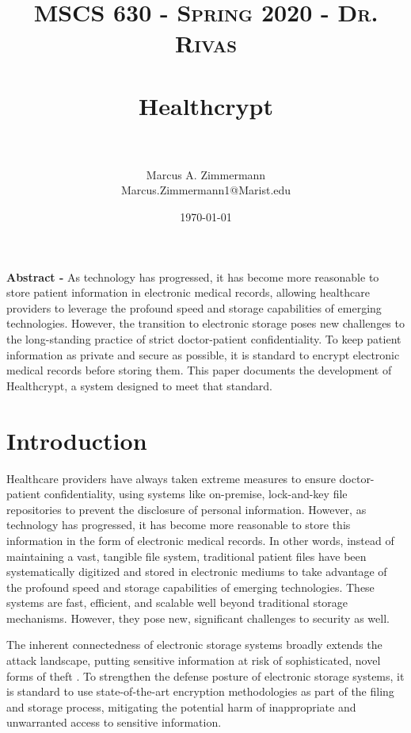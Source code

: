 \documentclass[letterpaper, 10pt,DIV=13]{scrartcl}
\title{	
   \normalfont \normalsize
   \textsc{MSCS 630 - Spring 2020 - Dr. Rivas} \\ [10pt] %
   \horrule{0.5pt} \\[0.25cm] 	%
   \huge Healthcrypt  \\     	    %
   \horrule{0.5pt} \\[0.25cm] 	%
}
\author{Marcus A. Zimmermann \\ \normalsize Marcus.Zimmermann1@Marist.edu}
\date{\normalsize\today} 	%
\begin{document}
\maketitle %

\begin{multicols}{2}

\begin{spacing}{1.25}
\textbf{Abstract -} As technology has progressed, it has become more reasonable to store patient information in electronic medical records, allowing healthcare providers to leverage the profound speed and storage capabilities of emerging technologies. However, the transition to electronic storage poses new challenges to the long-standing practice of strict doctor-patient confidentiality. To keep patient information as private and secure as possible, it is standard to encrypt electronic medical records before storing them. This paper documents the development of Healthcrypt, a system designed to meet that standard.
\end{spacing}

\vspace{-2.5pt}

\section*{Introduction}
\begin{spacing}{1.25}
Healthcare providers have always taken extreme measures to ensure doctor-patient confidentiality, using systems like on-premise, lock-and-key file repositories to prevent the disclosure of personal information. However, as technology has progressed, it has become more reasonable to store this information in the form of electronic medical records. In other words, instead of maintaining a vast, tangible file system, traditional patient files have been systematically digitized and stored in electronic mediums to take advantage of the profound speed and storage capabilities of emerging technologies. These systems are fast, efficient, and scalable well beyond traditional storage mechanisms. However, they pose new, significant challenges to security as well.

The inherent connectedness of electronic storage systems broadly extends the attack landscape, putting sensitive information at risk of sophisticated, novel forms of theft \cite{nistitl2017}. To strengthen the defense posture of electronic storage systems, it is standard to use state-of-the-art encryption methodologies as part of the filing and storage process, mitigating the potential harm of inappropriate and unwarranted access to sensitive information.


\end{spacing}
\end{multicols}
\end{document}
